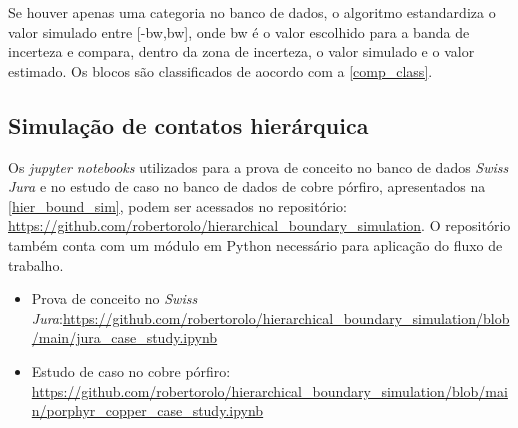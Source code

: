 Se houver apenas uma categoria no banco de dados, o algoritmo estandardiza o valor simulado entre [-bw,bw], onde bw é o valor escolhido para a banda de incerteza e compara, dentro da zona de incerteza, o valor simulado e o valor estimado. Os blocos são classificados de aocordo com a \autoref{comp_class}.

\subsection{Simulação de contatos hierárquica}

Os \textit{jupyter notebooks} utilizados para a prova de conceito no banco de dados \textit{Swiss Jura} e no estudo de caso no banco de dados de cobre pórfiro, apresentados na \autoref{hier_bound_sim}, podem ser acessados no repositório: \url{https://github.com/robertorolo/hierarchical_boundary_simulation}. O repositório também conta com um módulo em Python necessário para aplicação do fluxo de trabalho.

\begin{itemize}
    \item Prova de conceito no \textit{Swiss Jura}:\url{https://github.com/robertorolo/hierarchical_boundary_simulation/blob/main/jura_case_study.ipynb}
    \item Estudo de caso no cobre pórfiro: \url{https://github.com/robertorolo/hierarchical_boundary_simulation/blob/main/porphyr_copper_case_study.ipynb}
\end{itemize}

















